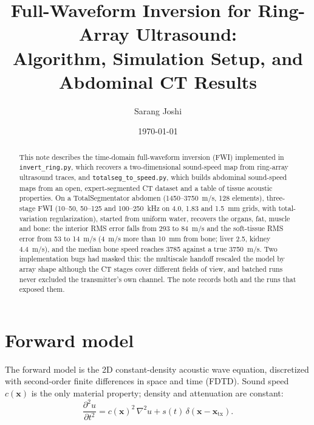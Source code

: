 \documentclass[11pt]{article}
\title{Full-Waveform Inversion for Ring-Array Ultrasound:\\
Algorithm, Simulation Setup, and Abdominal CT Results}
\author{Sarang Joshi}
\date{\today}
\newcommand{\code}[1]{\texttt{#1}}
\begin{document}
\maketitle

\begin{abstract}
This note describes the time-domain full-waveform inversion (FWI) implemented in
\code{invert\_ring.py}, which recovers a two-dimensional sound-speed map from
ring-array ultrasound traces, and \code{totalseg\_to\_speed.py}, which builds
abdominal sound-speed maps from an open, expert-segmented CT dataset and a
table of tissue acoustic properties. On a TotalSegmentator abdomen
(1450--3750~m/s, 128 elements), three-stage FWI (10--50, 50--125 and
100--250~kHz on 4.0, 1.83 and 1.5~mm grids, with total-variation
regularization), started from uniform water, recovers the organs, fat, muscle
and bone: the interior RMS error falls from 293 to 84~m/s and the soft-tissue
RMS error from 53 to 14~m/s (4~m/s more than 10~mm from bone; liver 2.5,
kidney 4.4~m/s), and the median bone speed reaches 3785 against a true
3750~m/s. Two implementation bugs had masked this: the multiscale handoff
rescaled the model by array shape although the CT stages cover different fields
of view, and batched runs never excluded the transmitter's own channel. The
note records both and the runs that exposed them.
\end{abstract}

\section{Forward model}

The forward model is the 2D constant-density acoustic wave equation,
discretized with second-order finite differences in space and time (FDTD).
Sound speed $c(\mathbf{x})$ is the only material property; density and
attenuation are constant:
\begin{equation}
  \frac{\partial^2 u}{\partial t^2} = c(\mathbf{x})^2\,\nabla^2 u
  + s(t)\,\delta(\mathbf{x}-\mathbf{x}_{\mathrm{tx}}).
\end{equation}
\end{document}
